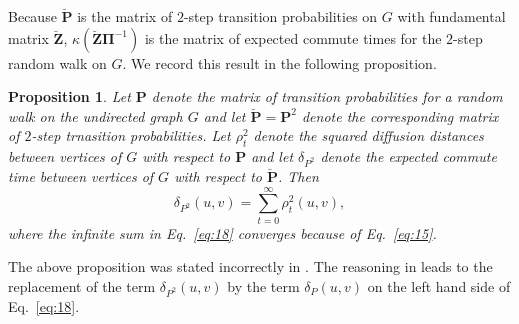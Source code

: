 \documentclass[10pt,twocolumn]{article}
\newtheorem{proposition}[theorem]{Proposition}
\numberwithin{equation}{section}
\begin{document}
Because $\breve{\mathbf{P}}$ is the matrix of $2$-step transition
probabilities on $G$ with fundamental matrix $\breve{\mathbf{Z}}$,
$\kappa \left( \breve{\mathbf{Z}} \bm{\Pi}^{-1} \right)$ is the
matrix of expected commute times for the $2$-step random walk on $G$.
We record this result in the following proposition.
\begin{proposition}
  \label{prop:7}
Let $\mathbf{P}$ denote the matrix of transition probabilities for  
a random walk on the undirected graph $G$ and let
$\breve{\mathbf{P}} = \mathbf{P}^{2}$ denote the corresponding
matrix of $2$-step trnasition probabilities.  Let
$\rho_{t}^{2}$ denote the squared diffusion distances between
  vertices of $G$ with respect to
  $\mathbf{P}$ and let
$\delta_{P^{2}}$ denote the expected
  commute
  time between vertices of $G$ with respect to $\breve{\mathbf{P}}$.
Then
  \begin{equation}
    \label{eq:18}
    \delta_{P^{2}}(u,v) = \sum_{t = 0}^{\infty}{\rho_{t}^{2}(u,v)},
  \end{equation}
where the infinite sum in Eq.~\eqref{eq:18} converges because of Eq.~\eqref{eq:15}.
\end{proposition}
The above proposition was stated incorrectly in
\cite{qui07:_clust}. The reasoning in \cite{qui07:_clust} leads to
the replacement of the term $\delta_{P^2}(u,v)$ by the term
$\delta_{P}(u,v)$ on the left hand side of Eq.~\eqref{eq:18}.
%
%
%
\end{document}
